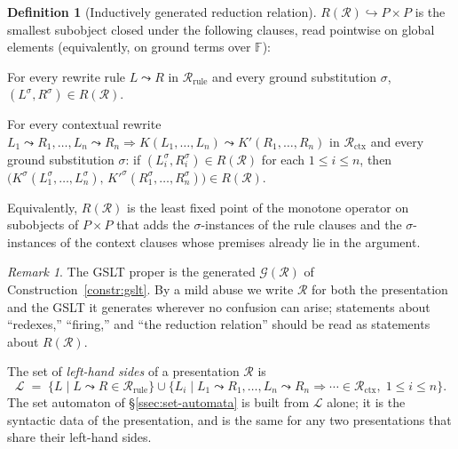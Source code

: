\documentclass[11pt]{article}
\theoremstyle{plain}
\theoremstyle{definition}
\newtheorem{definition}[theorem]{Definition}
\theoremstyle{remark}
\newtheorem{remark}[theorem]{Remark}
\newcommand{\rew}{\leadsto}
\newcommand{\Lhs}{\mathcal{L}}
\begin{document}
\begin{definition}[Inductively generated reduction relation]\label{def:reduction-relation}
$R(\mathcal{R}) \hookrightarrow P \times P$ is the smallest subobject
closed under the following clauses, read pointwise on global elements
(equivalently, on ground terms over $\mathbb{F}$):
\begin{description}[leftmargin=2em,style=nextline]
  \item[(Rule)] For every rewrite rule $L \rew R$ in
        $\mathcal{R}_{\mathrm{rule}}$ and every ground substitution
        $\sigma$, $(L^{\sigma}, R^{\sigma}) \in R(\mathcal{R})$.
  \item[(Context)] For every contextual rewrite
        $L_{1} \rew R_{1}, \ldots, L_{n} \rew R_{n} \Rightarrow
         K(L_{1}, \ldots, L_{n}) \rew K'(R_{1}, \ldots, R_{n})$
        in $\mathcal{R}_{\mathrm{ctx}}$ and every ground substitution
        $\sigma$: if
        $(L_{i}^{\sigma}, R_{i}^{\sigma}) \in R(\mathcal{R})$ for each
        $1 \le i \le n$, then
        $\bigl(K^{\sigma}(L_{1}^{\sigma}, \ldots, L_{n}^{\sigma}),\,
              K'^{\sigma}(R_{1}^{\sigma}, \ldots, R_{n}^{\sigma})\bigr)
         \in R(\mathcal{R})$.
\end{description}
Equivalently, $R(\mathcal{R})$ is the least fixed point of the
monotone operator on subobjects of $P \times P$ that adds the
$\sigma$-instances of the rule clauses and the $\sigma$-instances of
the context clauses whose premises already lie in the argument.
\end{definition}

\begin{remark}\label{rmk:presentation}
The GSLT proper is the generated $\mathcal{G}(\mathcal{R})$ of
Construction~\ref{constr:gslt}. By a mild abuse we write $\mathcal{R}$
for both the presentation and the GSLT it generates wherever no
confusion can arise; statements about ``redexes,'' ``firing,'' and
``the reduction relation'' should be read as statements about
$R(\mathcal{R})$.
\end{remark}

The set of \emph{left-hand sides} of a presentation $\mathcal{R}$ is
\[
  \Lhs \;=\; \{L \mid L \rew R \in \mathcal{R}_{\mathrm{rule}}\} \cup
  \{L_{i} \mid L_{1} \rew R_{1}, \ldots, L_{n} \rew R_{n} \Rightarrow \cdots \in \mathcal{R}_{\mathrm{ctx}},\; 1 \le i \le n\}.
\]
The set automaton of \S\ref{ssec:set-automata} is built from $\Lhs$
alone; it is the syntactic data of the presentation, and is the same
for any two presentations that share their left-hand sides.
\end{document}
